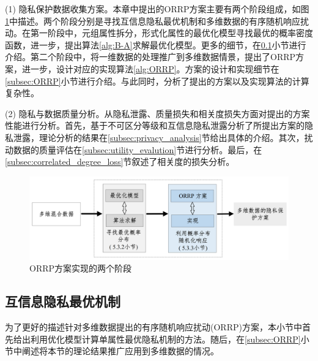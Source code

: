(1) 隐私保护数据收集方案。本章中提出的ORRP方案主要有两个阶段组成，如图\ref{fig:chapter06_Fig02}中描述。两个阶段分别是寻找互信息隐私最优机制和多维数据的有序随机响应扰动。在第一阶段中，元组属性拆分，形式化属性的最优化模型寻找最优的概率密度函数，进一步，提出算法\ref{alg:B-A}求解最优化模型。更多的细节，在\ref{subsec:MI_optimal_mechanism}小节进行介绍。第二个阶段中，将一维数据的处理推广到多维数据情景，提出了ORRP方案，进一步，设计对应的实现算法\ref{alg:ORRP}。方案的设计和实现细节在\ref{subsec:ORRP}小节进行介绍。与此同时，分析了提出的方案以及实现算法的计算复杂性。

(2) 隐私与数据质量分析。从隐私泄露、质量损失和相关度损失方面对提出的方案性能进行分析。首先，基于不可区分等级和互信息隐私泄露分析了所提出方案的隐私泄露，理论分析的结果在\ref{subsec:privacy_analysis}节给出具体的介绍。其次，扰动数据的质量评估在\ref{subsec:utility_evalution}节进行分析。最后，在\ref{subsec:correlated_degree_loss}节叙述了相关度的损失分析。


\begin{figure}[htbp]
	\centering
	\includegraphics[width = 0.99\linewidth]{./figures/chapter06/chapter06_2.jpg}
	\caption{ORRP方案实现的两个阶段}
	\label{fig:chapter06_Fig02}
\end{figure}

\subsection{互信息隐私最优机制}\label{subsec:MI_optimal_mechanism}

为了更好的描述针对多维数据提出的有序随机响应扰动(ORRP)方案，本小节中首先给出利用优化模型计算单属性最优隐私机制的方法。随后，在\ref{subsec:ORRP}小节中阐述将本节的理论结果推广应用到多维数据的情况。


